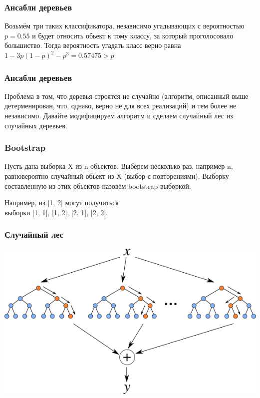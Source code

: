 \documentclass[14pt]{beamer}
\begin{document}
\begin{frame}
\frametitle{Ансабли деревьев}

		Возьмём три таких классификатора, независимо угадывающих с вероятностью $p = 0.55$ и будет относить обьект к тому классу, за который проголосовало большиство. Тогда вероятность угадать класс верно равна $1 - 3 p (1 - p)^2 - p^3 = 0.57475 > p$

\end{frame}



\begin{frame}
\frametitle{Ансабли деревьев}

        Проблема в том, что деревья строятся не случайно (алгоритм, описанный выше детерменирован, что, однако, верно не для всех реализаций) и тем более не независимо. Давайте модифицируем алгоритм и сделаем случайный лес из случайных деревьев.
        
\end{frame}

\begin{frame}
\frametitle{Bootstrap}
        \begin{rudef}
            Пусть дана выборка X из n обьектов. Выберем несколько раз, например n, равновероятно случайный обьект из X (выбор с повторениями). Выборку составленную из этих обьектов назовём bootstrap-выборкой.
        \end{rudef}
        
        Например, из [1, 2] могут получиться \\ выборки [1, 1], [1, 2], [2, 1], [2, 2].
\end{frame}

\begin{frame}
\frametitle{Случайный лес}
	  \includegraphics[width=\textwidth]{tree_rf.png}
\end{frame}
\end{document}
